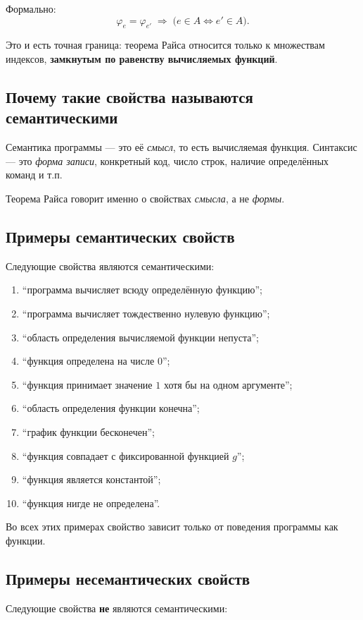 \documentclass[12pt,a4paper]{article}
\begin{document}
Формально:
$$
\varphi_e=\varphi_{e'} \;\Longrightarrow\; \bigl(e\in A \iff e'\in A\bigr).
$$

Это и есть точная граница: теорема Райса относится только к множествам индексов, \textbf{замкнутым по равенству вычисляемых функций}.

\subsection{Почему такие свойства называются семантическими}
Семантика программы --- это её \emph{смысл}, то есть вычисляемая функция.
Синтаксис --- это \emph{форма записи}, конкретный код, число строк, наличие определённых команд и т.п.

Теорема Райса говорит именно о свойствах \emph{смысла}, а не \emph{формы}.

\subsection{Примеры семантических свойств}
Следующие свойства являются семантическими:

\begin{enumerate}
    \item ``программа вычисляет всюду определённую функцию'';
    \item ``программа вычисляет тождественно нулевую функцию'';
    \item ``область определения вычисляемой функции непуста'';
    \item ``функция определена на числе $0$'';
    \item ``функция принимает значение $1$ хотя бы на одном аргументе'';
    \item ``область определения функции конечна'';
    \item ``график функции бесконечен'';
    \item ``функция совпадает с фиксированной функцией $g$'';
    \item ``функция является константой'';
    \item ``функция нигде не определена''.
\end{enumerate}

Во всех этих примерах свойство зависит только от поведения программы как функции.

\subsection{Примеры несемантических свойств}
Следующие свойства \textbf{не} являются семантическими:
\end{document}
